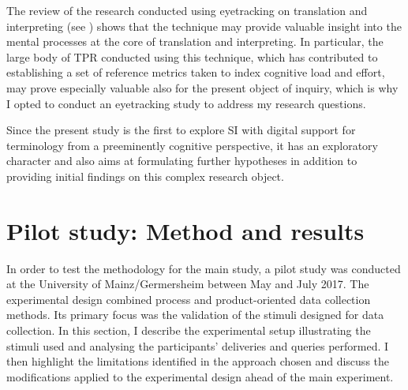 The review of the research conducted using eyetracking on translation and interpreting (see ) shows that the technique may provide valuable insight into the mental processes at the core of translation and interpreting. In particular, the large body of TPR conducted using this technique, which has contributed to establishing a set of reference metrics taken to index cognitive load and effort, may prove especially valuable also for the present object of inquiry, which is why I opted to conduct an eyetracking study to address my research questions.

Since the present study is the first to explore SI with digital support for terminology from a preeminently cognitive perspective, it has an exploratory character and also aims at formulating further hypotheses in addition to providing initial findings on this complex research object.






\section{Pilot study: Method and results} \label{pilot_study}
In order to test the methodology for the main study, a pilot study was conducted at the University of Mainz/Germersheim between May and July 2017. The experimental design combined process and product-oriented data collection methods. Its primary focus was the validation of the stimuli designed for data collection. In this section, I describe the experimental setup illustrating the stimuli used and analysing the participants' deliveries and queries performed. I then highlight the limitations identified in the approach chosen and discuss the modifications applied to the experimental design ahead of the main experiment.


